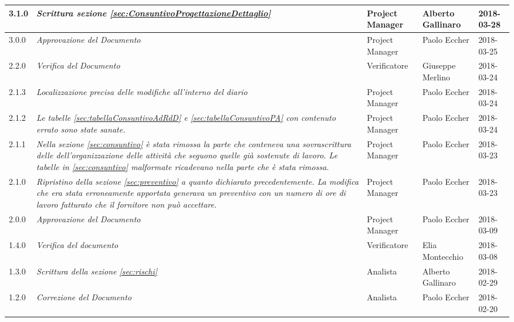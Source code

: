 \begin{longtable}[H]{C{2cm}|C{4cm}|C{3cm}|C{3cm}|R{2cm}}
		3.1.0 &\emph{Scrittura sezione \ref{sec:ConsuntivoProgettazioneDettaglio}} & Project Manager & Alberto Gallinaro & 2018-03-28 \\
		\hline
		
		3.0.0 &\emph{Approvazione del Documento} & Project Manager & Paolo Eccher & 2018-03-25 \\
		\hline
		
		2.2.0 &\emph{Verifica del Documento} & Verificatore & Giuseppe Merlino & 2018-03-24 \\
		\hline
		
		2.1.3 &\emph{Localizzazione precisa delle modifiche all'interno del diario} & Project Manager & Paolo Eccher & 2018-03-24 \\
		\hline
		
		2.1.2 &\emph{ Le tabelle \ref{sec:tabellaConsuntivoAdRdD} e \ref{sec:tabellaConsuntivoPA} con contenuto errato sono state sanate.} & Project Manager & Paolo Eccher & 2018-03-24 \\
		\hline
		
		2.1.1 &\emph{ Nella sezione \ref{sec:consuntivo} è stata rimossa la parte che conteneva una sovrascrittura delle dell'organizzazione delle attività che seguono quelle già sostenute di lavoro. Le  tabelle in \ref{sec:consuntivo} malformate ricadevano nella parte che è stata rimossa.} & Project Manager & Paolo Eccher & 2018-03-23 \\
		\hline
		
		2.1.0 &\emph{Ripristino della sezione \ref{sec:preventivo} a quanto dichiarato precedentemente. La modifica che era stata erroneamente apportata generava un preventivo con un numero di ore di lavoro fatturato che il fornitore non può accettare. } & Project Manager & Paolo Eccher & 2018-03-23 \\
		\hline
		
		2.0.0 &\emph{Approvazione del Documento} & Project Manager & Paolo Eccher & 2018-03-09 \\
		\hline
		
		1.4.0 &\emph{Verifica del documento} & Verificatore & Elia Montecchio & 2018-03-08 \\
		\hline
		
		1.3.0 &\emph{Scrittura della sezione \ref{sec:rischi}} & Analista & Alberto Gallinaro & 2018-02-29 \\
		\hline

		1.2.0 &\emph{Correzione del Documento} & Analista & Paolo Eccher & 2018-02-20 \\
		\hline
		

\end{longtable}
